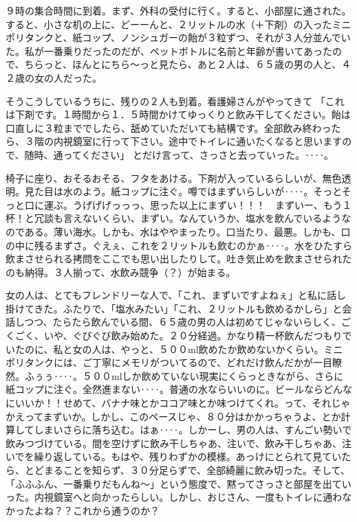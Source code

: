 ９時の集合時間に到着。まず、外科の受付に行く。すると、小部屋に通された。すると、小さな机の上に、どーーんと、２リットルの水（＋下剤）の入ったミニポリタンクと、紙コップ、ノンシュガーの飴が３粒ずつ、それが３人分並んでいた。私が一番乗りだったのだが、ペットボトルに名前と年齢が書いてあったので、ちらっと、ほんとにちら～っと見たら、あと２人は、６５歳の男の人と、４２歳の女の人だった。

そうこうしているうちに、残りの２人も到着。看護婦さんがやってきて
「これは下剤です。１時間から１．５時間かけてゆっくりと飲み干してください。飴は口直しに３粒まででしたら、舐めていただいても結構です。全部飲み終わったら、３階の内視鏡室に行って下さい。途中でトイレに通いたくなると思いますので、随時、通ってください」
とだけ言って、さっさと去っていった。‥‥。

椅子に座り、おそるおそる、フタをあける。下剤が入っているらしいが、無色透明。見た目は水のよう。紙コップに注ぐ。噂ではまずいらしいが‥‥。そっとそっと口に運ぶ。うげげげっっっ、思った以上にまずい！！！　まずいー、もう１杯！と冗談も言えないくらい、まずい。なんていうか、塩水を飲んでいるようなのである。薄い海水。しかも、水はややまったり。口当たり、最悪。しかも、口の中に残るまずさ。ぐえぇ、これを２リットルも飲むのかぁ‥‥。水をひたすら飲まさせられる拷問をここでも思い出したりして。吐き気止めを飲まさせられたのも納得。３人揃って、水飲み競争（？）が始まる。

女の人は、とてもフレンドリーな人で、「これ、まずいですよねぇ」と私に話し掛けてきた。ふたりで、「塩水みたい」「これ、２リットルも飲めるかしら」と会話しつつ、たらたら飲んでいる間、６５歳の男の人は初めてじゃないらしく、ごくごく、いや、ぐびぐび飲み始めた。２０分経過。かなり精一杯飲んだつもりでいたのに、私と女の人は、やっと、５００ml飲めたか飲めないかくらい。ミニポリタンクには、ご丁寧にメモリがついてるので、どれだけ飲んだかが一目瞭然。ふぅぅ‥‥。５００mlしか飲めていない現実にくらっときながら、さらに紙コップに注ぐ。全然進まない‥‥。普通の水ならいいのに。ビールならどんなにいいか！！せめて、バナナ味とかココア味とか味つけてくれ。って、それじゃかえってまずいか。しかし、このペースじゃ、８０分はかかっちゃうよ、とか計算してしまいさらに落ち込む。はぁ‥‥。しかーし、男の人は、すんごい勢いで飲みつづけている。間を空けずに飲み干しちゃあ、注いで、飲み干しちゃあ、注いでを繰り返している。もはや、残りわずかの模様。あっけにとられて見ていたら、とどまることを知らず、３０分足らずで、全部綺麗に飲み切った。そして、「ふふふん、一番乗りだもんね～」という態度で、黙ってさっさと部屋を出ていった。内視鏡室へと向かったらしい。しかし、おじさん、一度もトイレに通わなかったよね？？これから通うのか？

